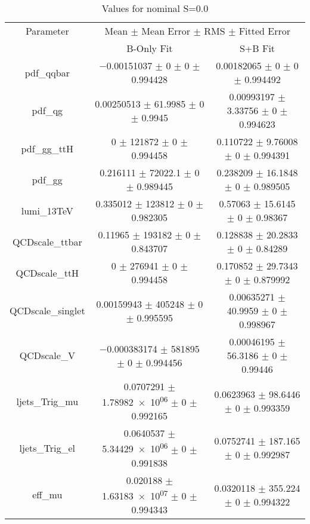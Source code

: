 \begin{table}
\centering
\caption{Values for nominal S=0.0}
\begin{tabular}{ccc}
\toprule
Parameter & \multicolumn{2}{c}{Mean $\pm$ Mean Error $\pm$ RMS $\pm$ Fitted Error}\\
 & B-Only Fit & S+B Fit\\
\midrule
pdf\_qqbar & \num{-0.00151037} $\pm$ \num{0} $\pm$ \num{0} $\pm$ \num{0.994428} & \num{0.00182065} $\pm$ \num{0} $\pm$ \num{0} $\pm$ \num{0.994492}\\
pdf\_qg & \num{0.00250513} $\pm$ \num{61.9985} $\pm$ \num{0} $\pm$ \num{0.9945} & \num{0.00993197} $\pm$ \num{3.33756} $\pm$ \num{0} $\pm$ \num{0.994623}\\
pdf\_gg\_ttH & \num{0} $\pm$ \num{121872} $\pm$ \num{0} $\pm$ \num{0.994458} & \num{0.110722} $\pm$ \num{9.76008} $\pm$ \num{0} $\pm$ \num{0.994391}\\
pdf\_gg & \num{0.216111} $\pm$ \num{72022.1} $\pm$ \num{0} $\pm$ \num{0.989445} & \num{0.238209} $\pm$ \num{16.1848} $\pm$ \num{0} $\pm$ \num{0.989505}\\
lumi\_13TeV & \num{0.335012} $\pm$ \num{123812} $\pm$ \num{0} $\pm$ \num{0.982305} & \num{0.57063} $\pm$ \num{15.6145} $\pm$ \num{0} $\pm$ \num{0.98367}\\
QCDscale\_ttbar & \num{0.11965} $\pm$ \num{193182} $\pm$ \num{0} $\pm$ \num{0.843707} & \num{0.128838} $\pm$ \num{20.2833} $\pm$ \num{0} $\pm$ \num{0.84289}\\
QCDscale\_ttH & \num{0} $\pm$ \num{276941} $\pm$ \num{0} $\pm$ \num{0.994458} & \num{0.170852} $\pm$ \num{29.7343} $\pm$ \num{0} $\pm$ \num{0.879992}\\
QCDscale\_singlet & \num{0.00159943} $\pm$ \num{405248} $\pm$ \num{0} $\pm$ \num{0.995595} & \num{0.00635271} $\pm$ \num{40.9959} $\pm$ \num{0} $\pm$ \num{0.998967}\\
QCDscale\_V & \num{-0.000383174} $\pm$ \num{581895} $\pm$ \num{0} $\pm$ \num{0.994456} & \num{0.00046195} $\pm$ \num{56.3186} $\pm$ \num{0} $\pm$ \num{0.99446}\\
ljets\_Trig\_mu & \num{0.0707291} $\pm$ \num{1.78982e+06} $\pm$ \num{0} $\pm$ \num{0.992165} & \num{0.0623963} $\pm$ \num{98.6446} $\pm$ \num{0} $\pm$ \num{0.993359}\\
ljets\_Trig\_el & \num{0.0640537} $\pm$ \num{5.34429e+06} $\pm$ \num{0} $\pm$ \num{0.991838} & \num{0.0752741} $\pm$ \num{187.165} $\pm$ \num{0} $\pm$ \num{0.992987}\\
eff\_mu & \num{0.020188} $\pm$ \num{1.63183e+07} $\pm$ \num{0} $\pm$ \num{0.994343} & \num{0.0320118} $\pm$ \num{355.224} $\pm$ \num{0} $\pm$ \num{0.994322}\\

\end{tabular}
\end{table}

